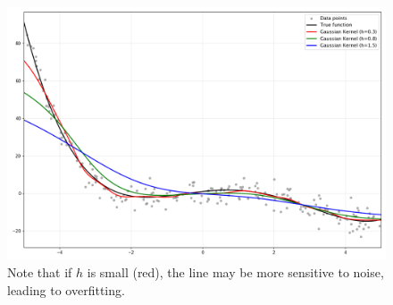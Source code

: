 \begin{example}
    \begin{figure}[H]
      \centering 
      \includegraphics[scale=0.4]{img/kernel_reg_1d.png}
      \caption{Note that if $h$ is small (red), the line may be more sensitive to noise, leading to overfitting. } 
    \end{figure}
  \end{example}

